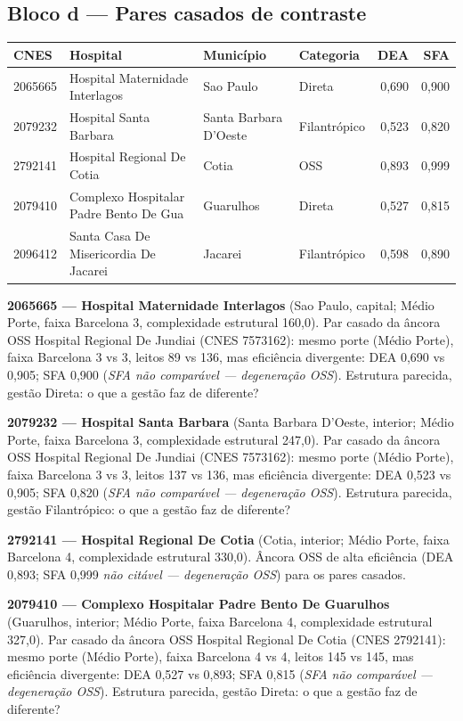 \documentclass[12pt,a4paper]{article}
\begin{document}
\subsection{Bloco d --- Pares casados de contraste}
\begin{center}\small
\begin{tabular}{llllrr}
\toprule
CNES & Hospital & Município & Categoria & DEA & SFA \\
\midrule
2065665 & Hospital Maternidade Interlagos & Sao Paulo & Direta & 0,690 & 0,900 \\
2079232 & Hospital Santa Barbara & Santa Barbara D'Oeste & Filantrópico & 0,523 & 0,820 \\
2792141 & Hospital Regional De Cotia & Cotia & OSS & 0,893 & 0,999 \\
2079410 & Complexo Hospitalar Padre Bento De Gua & Guarulhos & Direta & 0,527 & 0,815 \\
2096412 & Santa Casa De Misericordia De Jacarei & Jacarei & Filantrópico & 0,598 & 0,890 \\
\bottomrule
\end{tabular}
\end{center}
\noindent\textbf{2065665 --- Hospital Maternidade Interlagos} (Sao Paulo, capital; Médio Porte, faixa Barcelona 3, complexidade estrutural 160,0). Par casado da âncora OSS Hospital Regional De Jundiai (CNES 7573162): mesmo porte (Médio Porte), faixa Barcelona 3 vs 3, leitos 89 vs 136, mas eficiência divergente: DEA 0,690 vs 0,905; SFA 0,900 (\emph{SFA não comparável --- degeneração OSS}). Estrutura parecida, gestão Direta: o que a gestão faz de diferente?\par\medskip
\noindent\textbf{2079232 --- Hospital Santa Barbara} (Santa Barbara D'Oeste, interior; Médio Porte, faixa Barcelona 3, complexidade estrutural 247,0). Par casado da âncora OSS Hospital Regional De Jundiai (CNES 7573162): mesmo porte (Médio Porte), faixa Barcelona 3 vs 3, leitos 137 vs 136, mas eficiência divergente: DEA 0,523 vs 0,905; SFA 0,820 (\emph{SFA não comparável --- degeneração OSS}). Estrutura parecida, gestão Filantrópico: o que a gestão faz de diferente?\par\medskip
\noindent\textbf{2792141 --- Hospital Regional De Cotia} (Cotia, interior; Médio Porte, faixa Barcelona 4, complexidade estrutural 330,0). Âncora OSS de alta eficiência (DEA 0,893; SFA 0,999 \emph{não citável --- degeneração OSS}) para os pares casados.\par\medskip
\noindent\textbf{2079410 --- Complexo Hospitalar Padre Bento De Guarulhos} (Guarulhos, interior; Médio Porte, faixa Barcelona 4, complexidade estrutural 327,0). Par casado da âncora OSS Hospital Regional De Cotia (CNES 2792141): mesmo porte (Médio Porte), faixa Barcelona 4 vs 4, leitos 145 vs 145, mas eficiência divergente: DEA 0,527 vs 0,893; SFA 0,815 (\emph{SFA não comparável --- degeneração OSS}). Estrutura parecida, gestão Direta: o que a gestão faz de diferente?\par\medskip
\end{document}
